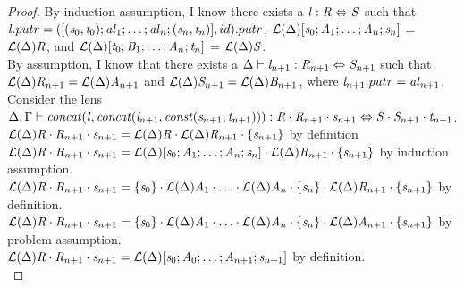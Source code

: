 \begin{lemma}
\begin{proof}
By induction assumption, I know
there exists a $\mathit{l} : \mathit{R} \Leftrightarrow \mathit{S}$ such that
$\mathit{l}.putr = ([(\mathit{s}_0,\mathit{t}_0);\mathit{al}_1 ; \ldots ; \mathit{al}_n;(\mathit{s}_n,\mathit{t}_n)],id).putr$,
$\mathcal{L}(\Delta){[\mathit{s}_0 ; \mathit{A}_1 ; \ldots ; \mathit{A}_n ; \mathit{s}_n]}$ =
$\mathcal{L}(\Delta){\mathit{R}}$,
and $\mathcal{L}(\Delta){[\mathit{t}_0 ; \mathit{B}_1 ; \ldots ; \mathit{A}_n ; \mathit{t}_n]}$ = $\mathcal{L}(\Delta){\mathit{S}}$.\\
By assumption, I know that there exists a $\Delta \vdash \mathit{l}_{n+1} : \mathit{R}_{n+1} \Leftrightarrow \mathit{S}_{n+1}$ such that $\mathcal{L}(\Delta){\mathit{R}_{n+1}}=\mathcal{L}(\Delta){\mathit{A}_{n+1}}$
and $\mathcal{L}(\Delta){\mathit{S}_{n+1}}=\mathcal{L}(\Delta){\mathit{B}_{n+1}}$, where $\mathit{l}_{n+1}.putr=\mathit{al}_{n+1}$.\\
Consider the lens $\Delta, \Gamma \vdash \mathit{concat}(\mathit{l},\mathit{concat}(\mathit{l}_{n+1},\mathit{const}(\mathit{s}_{n+1},\mathit{t}_{n+1}))) : \mathit{R}\cdot\mathit{R}_{n+1}\cdot\mathit{s}_{n+1} \Leftrightarrow \mathit{S}\cdot\mathit{S}_{n+1}\cdot\mathit{t}_{n+1}$.\\
$\mathcal{L}(\Delta){\mathit{R}\cdot\mathit{R}_{n+1}\cdot\mathit{s}_{n+1}}
= \mathcal{L}(\Delta){\mathit{R}}\cdot\mathcal{L}(\Delta){\mathit{R}_{n+1}}\cdot\{\mathit{s}_{n+1}\}$
by definition\\
$\mathcal{L}(\Delta){\mathit{R}\cdot\mathit{R}_{n+1}\cdot\mathit{s}_{n+1}}
= \mathcal{L}(\Delta){[\mathit{s}_0;\mathit{A}_1; \ldots ; \mathit{A}_n;\mathit{s}_n]}
\cdot\mathcal{L}(\Delta){\mathit{R}_{n+1}}\cdot\{\mathit{s}_{n+1}\}$ by induction assumption.\\
$\mathcal{L}(\Delta){\mathit{R}\cdot\mathit{R}_{n+1}\cdot\mathit{s}_{n+1}}
= \{\mathit{s}_0\}\cdot\mathcal{L}(\Delta){\mathit{A}_1}\cdot\ldots\cdot\mathcal{L}(\Delta){\mathit{A}_n}\cdot\{\mathit{s}_n\}
\cdot\mathcal{L}(\Delta){\mathit{R}_{n+1}}\cdot\{\mathit{s}_{n+1}\}$ by definition.\\
$\mathcal{L}(\Delta){\mathit{R}\cdot\mathit{R}_{n+1}\cdot\mathit{s}_{n+1}}
= \{\mathit{s}_0\}\cdot\mathcal{L}(\Delta){\mathit{A}_1}\cdot\ldots\cdot\mathcal{L}(\Delta){\mathit{A}_n}\cdot\{\mathit{s}_n\}
\cdot\mathcal{L}(\Delta){\mathit{A}_{n+1}}\cdot\{\mathit{s}_{n+1}\}$ by problem assumption.\\
$\mathcal{L}(\Delta){\mathit{R}\cdot\mathit{R}_{n+1}\cdot\mathit{s}_{n+1}}
= \mathcal{L}(\Delta){[\mathit{s}_0;\mathit{A}_0;\ldots;\mathit{A}_{n+1};\mathit{s}_{n+1}]}$ by definition.\\


\end{proof}
\end{lemma}
